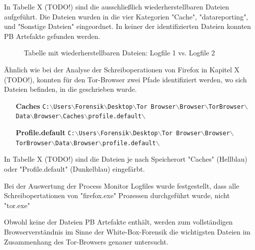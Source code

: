 \begin{appendices}
In Tabelle X (TODO!) sind die ausschließlich wiederherstellbaren Dateien aufgeführt.
Die Dateien wurden in die vier Kategorien "Cache", "datareporting", und "Sonstige Dateien" eingeordnet.
In keiner der identifizierten Dateien konnten PB Artefakte gefunden werden.

\begin{figure}[h!]
	\caption{Tabelle mit wiederherstellbaren Dateien: Logfile 1 vs. Logfile 2}
\end{figure}

Ähnlich wie bei der Analyse der Schreiboperationen von Firefox in Kapitel X (TODO!), konnten für den Tor-Browser zwei Pfade identifiziert werden, wo sich Dateien befinden, in die geschrieben wurde.
\begin{itemize}
\item[\textbf{Caches}] \texttt{C:$\backslash$Users$\backslash$Forensik$\backslash$Desktop$\backslash$Tor Browser$\backslash$Browser$\backslash$TorBrowser$\backslash$Data$\backslash$Browser$\backslash$Caches$\backslash$profile.default$\backslash$}
\item[\textbf{Profile.default}] \texttt{C:$\backslash$Users$\backslash$Forensik$\backslash$Desktop$\backslash$Tor Browser$\backslash$Browser$\backslash$TorBrowser$\backslash$Data$\backslash$Browser$\backslash$profile.default$\backslash$}
\end{itemize}
In Tabelle X (TODO!) sind die Dateien je nach Speicherort "Caches" (Hellblau) oder "Profile.default" (Dunkelblau)  eingefärbt. 

Bei der Auswertung der Process Monitor Logfiles wurde festgestellt, dass alle Schreibopertationen von "firefox.exe" Prozessen durchgeführt wurde, nicht "tor.exe" 

Obwohl keine der Dateien PB Artefakte enthält, werden zum vollständigen Browserverständnis im Sinne der White-Box-Forensik die wichtigsten Dateien im Zusammenhang des Tor-Browsers genauer untersucht.



\end{appendices}
